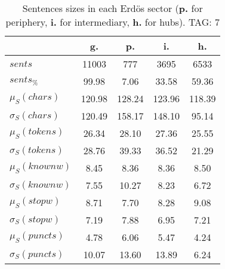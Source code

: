 \begin{table}[h!]
\begin{center}
\begin{tabular}{| l | c | c | c | c |}\hline
 & g. & p. & i. & h. \\\hline
$sents$ & 11003  & 777  & 3695  & 6533 \\\hline
$sents_{\%}$ & 99.98  & 7.06  & 33.58  & 59.36 \\\hline
$\mu_S(chars)$ & 120.98  & 128.24  & 123.96  & 118.39 \\\hline
$\sigma_S(chars)$ & 120.49  & 158.17  & 148.10  & 95.14 \\\hline
$\mu_S(tokens)$ & 26.34  & 28.10  & 27.36  & 25.55 \\\hline
$\sigma_S(tokens)$ & 28.76  & 39.33  & 36.52  & 21.29 \\\hline
$\mu_S(knownw)$ & 8.45  & 8.36  & 8.36  & 8.50 \\\hline
$\sigma_S(knownw)$ & 7.55  & 10.27  & 8.23  & 6.72 \\\hline
$\mu_S(stopw)$ & 8.71  & 7.70  & 8.28  & 9.08 \\\hline
$\sigma_S(stopw)$ & 7.19  & 7.88  & 6.95  & 7.21 \\\hline
$\mu_S(puncts)$ & 4.78  & 6.06  & 5.47  & 4.24 \\\hline
$\sigma_S(puncts)$ & 10.07  & 13.60  & 13.89  & 6.24 \\\hline
\end{tabular}
\caption{Sentences sizes in each Erd\"os sector ({{\bf p.}} for periphery, {{\bf i.}} for intermediary, {{\bf h.}} for hubs). TAG: 7}
\end{center}
\end{table}